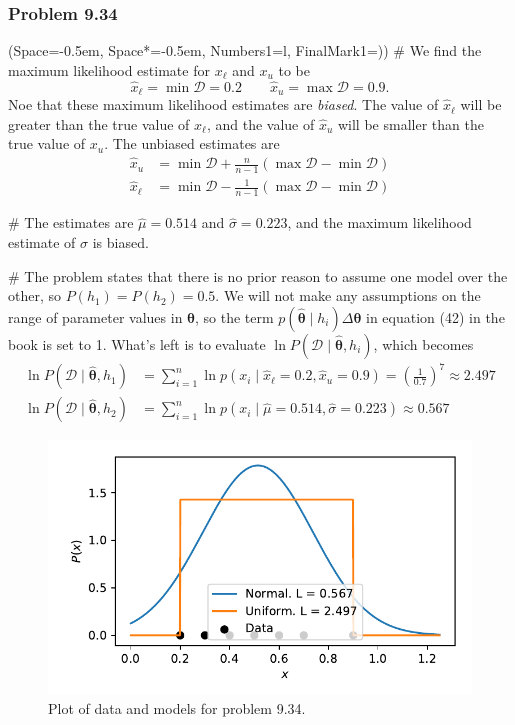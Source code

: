 \documentclass[12pt, a4paper]{article}
\newcommand{\listSpace}{-0.5em}%
\newcommand{\D}{\mathcal{D}}
\newcommand{\vect}[1]{\bm{#1}}
\begin{document}
{\subsubsection*{Problem 9.34}
\begin{easylist}[enumerate]
	\ListProperties(Space=\listSpace, Space*=\listSpace, Numbers1=l, FinalMark1={)})
	# We find the maximum likelihood estimate for $x_\ell$ and $x_u$ to be
	\begin{equation*}
		\hat{x}_\ell = \min \D = 0.2 \qquad 
		\hat{x}_u = \max \D = 0.9.
	\end{equation*}
	Noe that these maximum likelihood estimates are \emph{biased}.
	The value of $\hat{x}_\ell$ will be greater than the true value of $x_\ell$, and the value of $\hat{x}_u$ will be smaller than the true value of $x_u$.
	The unbiased estimates are
	\begin{align*}
		\hat{x}_u &= \min \D + \frac{n}{n-1} \left( \max \D - \min \D \right) \\
		\hat{x}_\ell &= \min \D - \frac{1}{n-1} \left( \max \D - \min \D \right)
	\end{align*}
	
	# The estimates are $\hat{\mu} = 0.514$ and $\hat{\sigma} = 0.223$, and the maximum likelihood estimate of $\sigma$ is biased.
	
	# The problem states that there is no prior reason to assume one model over the other, so $P(h_1) = P(h_2) = 0.5$.
	We will not make any assumptions on the range of parameter values in $\vect{\theta}$, so the term $p(\hat{\vect{\theta}} \mid h_i) \Delta \vect{\theta}$ in equation (42) in the book is set to 1.
	What's left is to evaluate $\ln P(\D \mid \hat{\vect{\theta}}, h_i)$, which becomes
	\begin{align*}
		\ln P(\D \mid \hat{\vect{\theta}}, h_1) &= 
		\sum_{i=1}^{n} \ln p(x_i \mid  \hat{x}_\ell = 0.2, \hat{x}_u = 0.9) = \left(\frac{1}{0.7}\right)^{7} \approx 2.497 \\
		\ln P(\D \mid \hat{\vect{\theta}}, h_2) &= 
		\sum_{i=1}^{n} \ln p(x_i \mid  \hat{\mu} = 0.514, \hat{\sigma} = 0.223) \approx 0.567
	\end{align*}
\end{easylist}
	
\begin{figure}[ht!]
\centering
\includegraphics[width=0.65\linewidth]{figs/duda_ch9_prob34}
\caption{Plot of data and models for problem 9.34.}
\label{fig:duda_ch9_prob34}
\end{figure}


}
\end{document}
